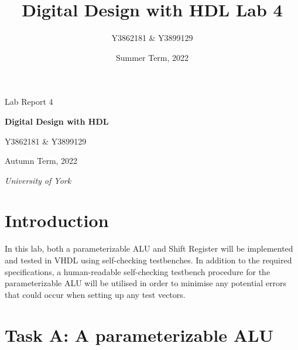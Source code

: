 \documentclass[10pt]{article}
\title{Digital Design with HDL Lab 4}
\author{Y3862181 \& Y3899129}
\date{Summer Term, 2022}
\begin{document}
\begin{titlepage}
\centering
{\Huge Lab Report 4}

\vspace{3cm}

{\LARGE \textbf{ Digital Design with HDL}}

\vspace{3cm}

{\huge Y3862181 \& Y3899129}

\vspace{3cm}


{\large Autumn Term, 2022}
\vfill

{\itshape University of York}
\end{titlepage}

\tableofcontents
\newpage

\pagestyle{content}
\section{Introduction}

In this lab, both a parameterizable ALU and Shift Register will be implemented and tested in VHDL using self-checking testbenches. In addition to the required specifications, a human-readable self-checking testbench procedure for the parameterizable ALU will be utilised in order to minimise any potential errors that could occur when setting up any test vectors.    

\newpage

\section{Task A: A parameterizable ALU}
\end{document}
